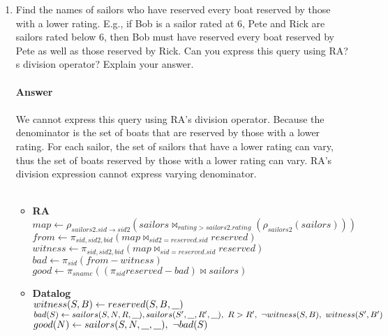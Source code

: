 \documentclass{article}
\newcommand{\anyvar}{\underline{\hspace{0.8em}}}
\newcommand{\RA}{\textbf{RA}}
\newcommand{\DL}{\textbf{Datalog}}
\begin{document}
\begin{enumerate}
	\begin{itemize}
	\item \RA \\
	$ notoldest \gets \pi_{sailors.sid}(sailors \bowtie_{sailors.age < sailors2.age} (\rho_{sailors2}sailors))$ \\
	$ oldest \gets \pi_{sname, rating}((\pi_{sid} sailors - notoldest) \bowtie sailors) $
	\item \DL \\
	$ notoldest(S) \gets sailors(S, \anyvar, \anyvar, A),\ sailors(S', \anyvar, \anyvar, A'),\ A < A' $ \\
	$ oldest(N, R) \gets sailors(S, N, R, \anyvar),\ \neg notoldest(S) $
	\end{itemize}
\item Find the names of sailors who have reserved every boat reserved by those with a lower rating. E.g., if Bob is a sailor rated at 6, Pete and Rick are sailors rated below 6, then Bob must have reserved every boat reserved by Pete as well as those reserved by Rick. Can you express this query using RA?s division operator? Explain your answer.\\
\\
\textbf{Answer}\\
\\
We cannot express this query using RA's division operator. Because the denominator is the set of boats that are reserved by those with a lower rating. For each sailor, the set of sailors that have a lower rating can vary, thus the set of boats reserved by those with a lower rating can vary. RA's division expression cannot express varying denominator.\\
\\
\begin{itemize}
	\item \RA \\
	$ map \gets \rho_{sailors2.sid \to sid2}(sailors \bowtie_{rating > sailors2.rating} (\rho_{sailors2} (sailors))) $ \\
	$ from \gets \pi_{sid, sid2, bid}(map \bowtie_{sid2 = reserved.sid} reserved) $ \\
	$ witness \gets \pi_{sid, sid2, bid}(map \bowtie_{sid = reserved.sid} reserved)$ \\
	$ bad \gets \pi_{sid} (from - witness) $ \\
	$ good \gets \pi_{sname}((\pi_{sid} reserved - bad) \bowtie sailors) $ 
	\item \DL \\
	$ witness(S, B) \gets reserved(S, B, \anyvar) $ \\
	$ bad(S) \gets sailors(S, N, R, \anyvar), sailors(S', \anyvar, R', \anyvar),\ R > R',\ \neg witness(S, B),\  witness(S', B') $ \\
	$ good(N) \gets sailors(S, N, \anyvar, \anyvar), \ \neg bad(S)$
\end{itemize}
	
\end{enumerate}
\end{document}
